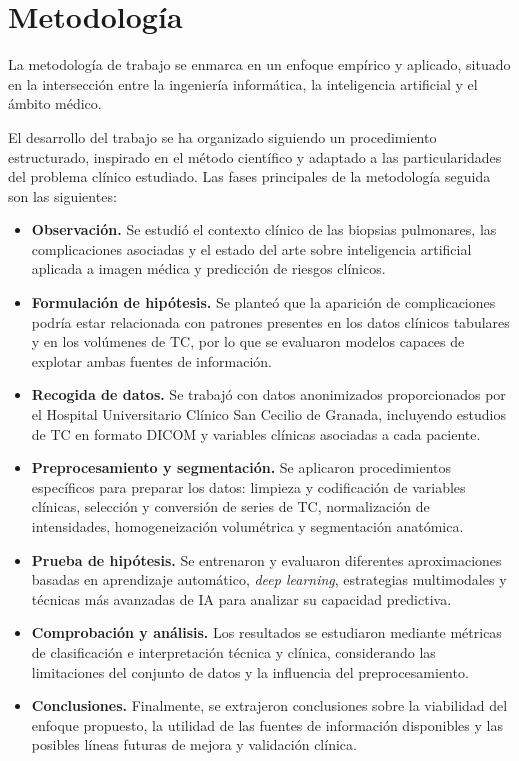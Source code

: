\section{Metodología}

La metodología de trabajo se enmarca en un enfoque empírico y aplicado, situado en la intersección entre la ingeniería informática, la inteligencia artificial y el ámbito médico.

El desarrollo del trabajo se ha organizado siguiendo un procedimiento estructurado, inspirado en el método científico y adaptado a las particularidades del problema clínico estudiado. Las fases principales de la metodología seguida son las siguientes:

\begin{itemize}
    \item \textbf{Observación.} Se estudió el contexto clínico de las biopsias pulmonares, las complicaciones asociadas y el estado del arte sobre inteligencia artificial aplicada a imagen médica y predicción de riesgos clínicos.

    \item \textbf{Formulación de hipótesis.} Se planteó que la aparición de complicaciones podría estar relacionada con patrones presentes en los datos clínicos tabulares y en los volúmenes de TC, por lo que se evaluaron modelos capaces de explotar ambas fuentes de información.

    \item \textbf{Recogida de datos.} Se trabajó con datos anonimizados proporcionados por el Hospital Universitario Clínico San Cecilio de Granada, incluyendo estudios de TC en formato DICOM y variables clínicas asociadas a cada paciente.

    \item \textbf{Preprocesamiento y segmentación.} Se aplicaron procedimientos específicos para preparar los datos: limpieza y codificación de variables clínicas, selección y conversión de series de TC, normalización de intensidades, homogeneización volumétrica y segmentación anatómica.

    \item \textbf{Prueba de hipótesis.} Se entrenaron y evaluaron diferentes aproximaciones basadas en aprendizaje automático, \textit{deep learning}, estrategias multimodales y técnicas más avanzadas de IA para analizar su capacidad predictiva.

    \item \textbf{Comprobación y análisis.} Los resultados se estudiaron mediante métricas de clasificación e interpretación técnica y clínica, considerando las limitaciones del conjunto de datos y la influencia del preprocesamiento.

    \item \textbf{Conclusiones.} Finalmente, se extrajeron conclusiones sobre la viabilidad del enfoque propuesto, la utilidad de las fuentes de información disponibles y las posibles líneas futuras de mejora y validación clínica.
\end{itemize}





